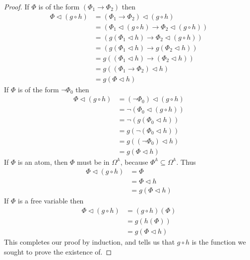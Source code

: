\documentclass{article}
\begin{document}
\begin{proof}
If $\Phi$ is of the form $(\Phi_1 \rightarrow \Phi_2)$ then
\begin{align*}
   \Phi \lhd (g \circ h)
&= (\Phi_1 \rightarrow \Phi_2) \lhd (g \circ h)                 \\
&= (\Phi_1 \lhd (g \circ h) \rightarrow \Phi_2 \lhd (g \circ h)) \tag{Definition of Assignment} \\
&= (g(\Phi_1 \lhd h) \rightarrow \Phi_2 \lhd (g \circ h))       \tag{Inductive Hypothesis I} \\
&= (g (\Phi_1 \lhd h) \rightarrow g(\Phi_2 \lhd h))            \tag{Inductive Hypothesis II} \\
&= g((\Phi_1 \lhd h) \rightarrow (\Phi_2 \lhd h))              \tag{Definition of $g$} \\
&= g((\Phi_1 \rightarrow \Phi_2) \lhd h)                       \tag{Definition of Assignment} \\
&= g(\Phi \lhd h)
\end{align*}
If $\Phi$ is of the form $\neg \Phi_0$ then
\begin{align*}
\Phi \lhd (g \circ h)
&= (\neg \Phi_0) \lhd (g \circ h) \\
&= \neg (\Phi_0 \lhd (g \circ h)) \tag{Definition of Assignment} \\
&= \neg (g(\Phi_0 \lhd h))       \tag{Inductive Hypothesis} \\
&= g(\neg (\Phi_0 \lhd h))       \tag{Definition of $g$} \\
&= g((\neg \Phi_0) \lhd h)       \tag{Definition of Assignment} \\
&= g(\Phi \lhd h)
\end{align*}
If $\Phi$ is an atom, then $\Phi$ must be in $\Omega^\mathbb{A}$, because $\Phi^\mathbb{A}\subseteq \Omega^\mathbb{A}$.
Thus
\begin{align*}
   \Phi \lhd (g \circ h)
&= \Phi \tag{Definition of Assignment} \\
&= \Phi \lhd h \tag{Definition of Assignment} \\
&= g(\Phi\lhd h) \tag{Definition of $g$}
\end{align*}
If $\Phi$ is a free variable then
\begin{align*}
   \Phi \lhd (g \circ h)
&= (g \circ h)(\Phi) \tag{Definition of Assignment} \\
&= g(h(\Phi)) \\
&= g(\Phi\lhd h) \tag{Definition of Assignment}
\end{align*}
This completes our proof by induction, and tells us that $g\circ h$ is the function we sought to prove the existence of.
\end{proof}
\end{document}
